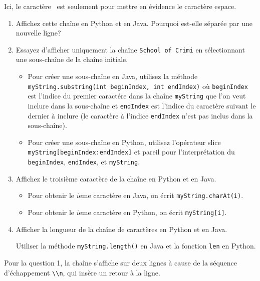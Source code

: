 \begin{Exercice}[10 minutes]
\begin{attention}
Ici, le caractère \textvisiblespace \ est seulement pour mettre en évidence le caractère espace. 
\end{attention}
\begin{enumerate}
\item Affichez cette chaîne en Python et en Java. Pourquoi est-elle séparée par une nouvelle ligne?
\item Essayez d'afficher uniquement la chaîne \texttt{School of Crimi} en sélectionnant une sous-chaîne de la chaîne initiale. 
\begin{conseil}
    \begin{itemize}
        \item Pour créer une sous-chaîne en Java, utilisez la méthode \texttt{myString.substring(int beginIndex, int endIndex)} où \texttt{beginIndex} est l'indice du premier caractére dans la chaîne \texttt{myString} que l'on veut inclure dans la sous-chaîne et \texttt{endIndex} est l'indice du caractère suivant le dernier à inclure (le caractère à l'indice \texttt{endIndex} n'est pas inclus dans la sous-chaîne).
        \item Pour créer une sous-chaîne en Python, utilisez l'opérateur slice \texttt{myString[beginIndex:endIndex]} et pareil pour l'interprétation du \texttt{beginIndex}, \texttt{endIndex}, et \texttt{myString}.
    \end{itemize}
\end{conseil}
\item Affichez le troisième caractère de la chaîne en Python et en Java. 
\begin{conseil}
    \begin{itemize}
        \item Pour obtenir le $i$eme caractère en Java, on écrit \texttt{myString.charAt(i)}.
    \item Pour obtenir le $i$eme caractère en Python, on écrit \texttt{myString[i]}.
    \end{itemize}
\end{conseil}
\item Afficher la longueur de la chaîne de caractères en Python et en Java.
\begin{conseil}
    Utiliser la méthode \texttt{myString.length()} en Java et la fonction \texttt{len} en Python.
\end{conseil}
\end{enumerate}
\begin{solution}
    Pour la question 1, la chaîne s'affiche sur deux lignes à cause de la séquence d'échappement \lstinline{\\n}, qui insère un retour à la ligne.
\end{solution}
\begin{solution}
   
\end{solution}
\begin{solution}
   
\end{solution}
\end{Exercice}


